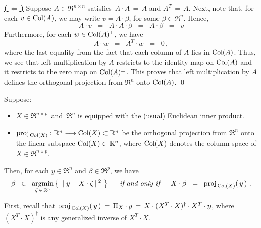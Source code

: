 \vskip 0.2cm
\noindent
\underline{\textbf{(\,$\Longleftarrow$\,)}}\quad
Suppose $A \in \Re^{n \times n}$ satisfies \,$A \cdot A \,=\, A$ and $A^{T} \,=\, A$.
Next, note that, for each $v \in \textnormal{Col}(A)$, we may write $v = A\cdot\beta$, for some $\beta\in\Re^{n}$.
Hence,
\begin{equation*}
A \cdot v
\;\;=\;\;
	A \cdot A \cdot \beta 
\;\;=\;\;
	A \cdot \beta 
\;\;=\;\;
	v
\end{equation*}
Furthermore, for each $w \in \textnormal{Col}(A)^{\perp}$, we have
\begin{equation*}
A \cdot w \;\;= \;\;A^{T} \cdot w \;\;=\;\; 0\,,
\end{equation*}
where the last equality from the fact that each column of $A$ lies in $\textnormal{Col}(A)$.
Thus, we see that left multiplication by $A$ restricts to the identity map on $\textnormal{Col}(A)$
and it restricts to the zero map on $\textnormal{Col}(A)^{\perp}$. This proves that left multiplication
by $A$ defines the orthogonal projection from $\Re^{n}$ onto $\textnormal{Col}(A)$.
\qed

\begin{proposition}
\mbox{}\vskip 0.1cm\noindent
Suppose:
\begin{itemize}
\item
	$X \in \Re^{n \times p}$\, and \,$\Re^{n}$ is equipped with the (usual) Euclidean inner product.
\item
	$\textnormal{proj}_{\,\textnormal{Col}(X)} : \mathbb{R}^{n} \longrightarrow \textnormal{Col}(X) \subset \mathbb{R}^{n}$
	be the orthogonal projection from $\Re^{n}$ onto the linear subspace $\textnormal{Col}(X) \subset \mathbb{R}^{n}$,
	where $\textnormal{Col}(X)$ denotes the column space of $X \in \Re^{n \times p}$.
\end{itemize}
Then, for each $y \in \Re^{n}$ and $\beta \in \Re^{p}$, we have
\begin{equation*}
\beta \;\;\in\;\; \underset{\zeta\,\in\,\mathbb{R}^{p}}{\textnormal{argmin}}\left\{\;\Vert\;y - X \cdot \zeta\,\Vert^{2}\;\right\}
\quad\;\;\textnormal{\it if and only if}\quad\;\;
X\cdot\beta \;\; = \;\; \textnormal{proj}_{\,\textnormal{Col}(X)}\!\left(\,y\,\right)\,.
\end{equation*}
\end{proposition}
\proof
First, recall that $\textnormal{proj}_{\,\textnormal{Col}(X)}(\,y\,) \,=\, \Pi_{X} \cdot y \,=\, X\cdot(X^{T}\cdot X)^{\dagger}\cdot X^{T} \cdot y$,
where $(X^{T} \cdot X)^{\dagger}$ is any generalized inverse of $X^{T} \cdot X$.

